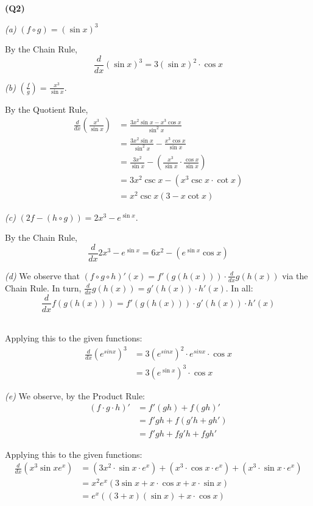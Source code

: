 \documentclass[12pt, a4paper]{article}
\newcommand{\dispst}{\displaystyle}
\newcommand{\ddx}{\frac{d}{dx}}
\begin{document}
\textbf{(Q2)}

\textit{(a)} $(f \circ g) = (\sin x)^3$

By the Chain Rule,
\[
    \ddx (\sin x)^3 = 3(\sin x)^2 \cdot \cos x
\]

\textit{(b)} $\dispst\left(\frac{f}{g}\right) = \dispst\frac{x^3}{\sin x}$.

By the Quotient Rule,
\begin{align*}
    \ddx \left(\frac{x^3}{\sin x}\right) & = \frac{3x^2 \sin x - x^3 \cos x}{\sin^2 x}\\
    & = \frac{3x^2 \sin x}{\sin^2x} - \frac{x^3 \cos x}{\sin x}\\
    & = \frac{3x^2}{\sin x} - \left(\frac{x^3}{\sin x} \cdot \frac{\cos x}{\sin x}\right)\\
    & = 3x^2 \csc x - \left(x^3 \csc x \cdot \cot x\right)\\
    & = x^2\csc x (3 - x \cot x)
\end{align*}

\textit{(c)} $\left(2f - (h \circ g)\right) = 2x^3 - e^{\sin x}$.

By the Chain Rule,
\[
    \ddx 2x^3 - e^{\sin x} = 6x^2 - (e^{\sin x} \cos x)
\]

\textit{(d)} We observe that $(f \circ g \circ h)'(x) = f'(g(h(x))) \cdot \ddx g(h(x))$
via the Chain Rule. In turn, $\ddx g(h(x)) = g'(h(x)) \cdot h'(x)$. In all:
\[
    \ddx f(g(h(x))) = f'(g(h(x))) \cdot g'(h(x)) \cdot h'(x)
\]\

Applying this to the given functions:
\begin{align*}
    \ddx (e^{sin x})^3 & = 3(e^{sin x})^2 \cdot e^{sin x} \cdot \cos x\\
    & = 3(e^{\sin x})^3 \cdot \cos x
\end{align*}

\textit{(e)} We observe, by the Product Rule:
\begin{align*}
    (f \cdot g \cdot h)' & = f'(gh) + f(gh)'\\
    & = f'gh + f(g'h + gh')\\
    & = f'gh + fg'h + fgh'
\end{align*}

Applying this to the given functions:
\begin{align*}
    \ddx \left(x^3 \sin x e^x\right) & = (3x^2 \cdot \sin x \cdot e^x)
    + (x^3 \cdot \cos x \cdot e^x) + (x^3 \cdot \sin x \cdot e^x)\\
    & = x^2 e^x\left(3\sin x + x \cdot \cos x + x \cdot \sin x\right)\\
    & = e^x\left((3 + x)(\sin x) + x \cdot \cos x\right)
\end{align*}
\end{document}
